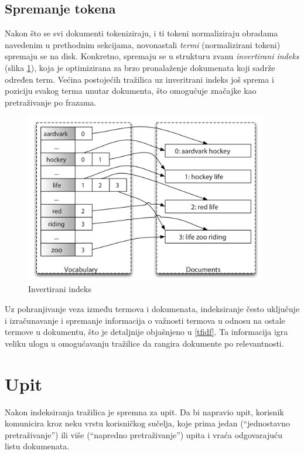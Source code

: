\documentclass[a4paper,twoside,12pt]{scrreprt}
\begin{document}
\subsection{Spremanje tokena}

Nakon što se svi dokumenti tokeniziraju, i ti tokeni normaliziraju obradama navedenim u prethodnim sekcijama, novonastali \textit{termi} (normalizirani tokeni) spremaju se na disk. Konkretno, spremaju se u strukturu zvanu \textit{invertirani indeks} (slika \ref{inverted_index}), koja je optimizirana za brzo pronalaženje dokumenata koji sadrže određen term. Većina postojećih tražilica uz inveritrani indeks još sprema i poziciju svakog terma unutar dokumenta, što omogućuje značajke kao pretraživanje po frazama.

\begin{figure}[H]
  \centering
  \includegraphics[width=300pt]{inverted_index}
  \caption{Invertirani indeks}
  \label{inverted_index}
\end{figure}

Uz pohranjivanje veza između termova i dokumenata, indeksiranje često uključuje i izračunavanje i spremanje informacija o važnosti termova u odnosu na ostale termove u dokumentu, što je detaljnije objašnjeno u \ref{tfidf}. Ta informacija igra veliku ulogu u omogućavanju tražilice da rangira dokumente po relevantnosti.

\section{Upit}

Nakon indeksiranja tražilica je spremna za upit. Da bi napravio upit, korisnik komunicira kroz neku vrstu korisničkog sučelja, koje prima jedan (``jednostavno pretraživanje'') ili više (``napredno pretraživanje'') upita i vraća odgovarajuću listu dokumenata.
\end{document}

